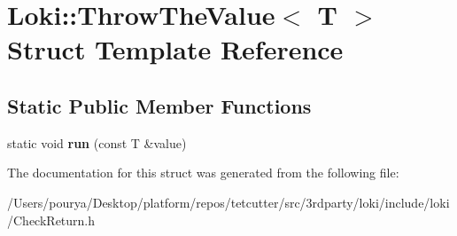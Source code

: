 \hypertarget{structLoki_1_1ThrowTheValue}{}\section{Loki\+:\+:Throw\+The\+Value$<$ T $>$ Struct Template Reference}
\label{structLoki_1_1ThrowTheValue}
\subsection*{Static Public Member Functions}
\begin{DoxyCompactItemize}
\item 
\hypertarget{structLoki_1_1ThrowTheValue_a9b446695fdd9fdec04808dde2e16e4b3}{}static void {\bfseries run} (const T \&value)\label{structLoki_1_1ThrowTheValue_a9b446695fdd9fdec04808dde2e16e4b3}

\end{DoxyCompactItemize}


The documentation for this struct was generated from the following file\+:\begin{DoxyCompactItemize}
\item 
/\+Users/pourya/\+Desktop/platform/repos/tetcutter/src/3rdparty/loki/include/loki/Check\+Return.\+h\end{DoxyCompactItemize}
